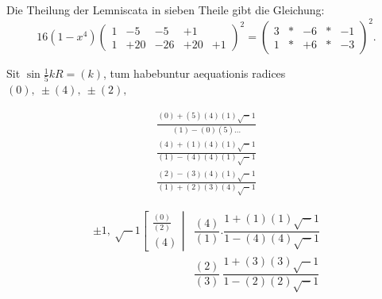 \begingroup
\setlength{\headheight}{25pt}
\NoSourceHead
{}
\noindent{\small [S. 69]}
\par\indent Die Theilung der Lemniscata in sieben Theile gibt die Gleichung:
\[16(1-x^4)\left(\begin{array}{rrrrr}1&-5&-5&+1&\\\hline1&+20&-26&+20&+1\end{array}\right)^2
=\left(\begin{array}{rrrrr}3&\ast&-6&\ast&-1\\\hline1&\ast&+6&\ast&-3\end{array}\right)^2.\]
\noindent{\small [S. 87]}
\par\indent Sit \(\sin\tfrac15kR=(k)\), tum habebuntur aequationis radices \((0),\ \pm(4),\ \pm(2),\)
\par\medskip
\noindent\begin{minipage}{.55\linewidth}
\[\begin{gathered}
\frac{(0)+(5)(4)(1)\surd-1}{(1)-(0)(5)\ldots}\\[9pt]
\frac{(4)+(1)(4)(1)\surd-1}{(1)-(4)(4)(1)\surd-1}\\[9pt]
\frac{(2)-(3)(4)(1)\surd-1}{(1)+(2)(3)(4)\surd-1}
\end{gathered}\]
\end{minipage}\hfill\begin{minipage}{.4\linewidth}
\centering
{}
\end{minipage}
\[\renewcommand{\arraystretch}{1.5}\begin{array}{lc|}
\pm1,\ \surd-1\left[\begin{array}{c}\frac{(0)}{(2)}\\(4)\end{array}\right|&
\dfrac{(4)}{(1)}.\dfrac{1+(1)(1)\surd-1}{1-(4)(4)\surd-1}\\[6pt]
&\dfrac{(2)}{(3)}\ \dfrac{1+(3)(3)\surd-1}{1-(2)(2)\surd-1}
\end{array}\]

